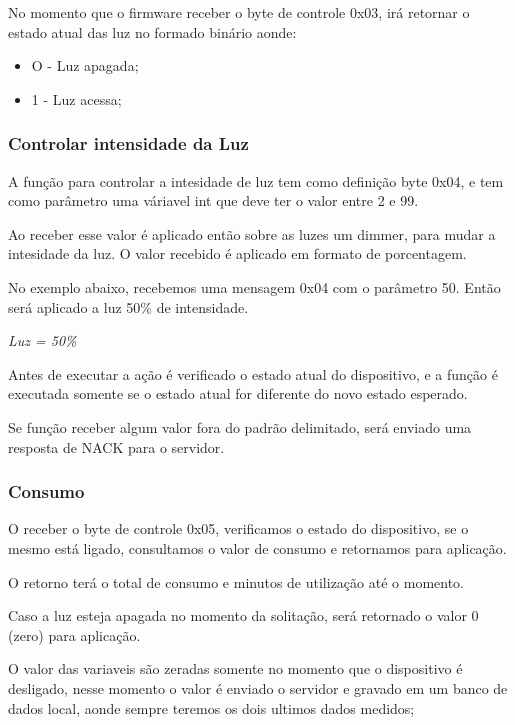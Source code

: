 \documentclass[openright]{normas-utf-tex} %
\begin{document}
No momento que o firmware receber o byte de controle 0x03, irá retornar o estado atual das luz no formado binário aonde:

\begin{itemize}
    \item O - Luz apagada;
    \item 1 - Luz acessa;
\end{itemize}

\subsubsection{Controlar intensidade da Luz}
A função para controlar a intesidade de luz tem como definição byte 0x04, e tem como parâmetro uma váriavel int que deve ter o valor entre 2 e 99.

Ao receber esse valor é aplicado então sobre as luzes um dimmer, para mudar a intesidade da luz. O valor recebido é aplicado em formato de porcentagem.

No exemplo abaixo, recebemos uma mensagem 0x04 com o parâmetro 50. Então será aplicado a luz 50\% de intensidade.

\begin{center}
    \textit{
    Luz =  50\%
    }
\end{center}

Antes de executar a ação é verificado o estado atual do dispositivo, e a função é executada somente se o estado atual for diferente do novo estado esperado.

Se função receber algum valor fora do padrão delimitado, será enviado uma resposta de NACK para o servidor.

\subsubsection{Consumo}
O receber o byte de controle 0x05, verificamos o estado do dispositivo, se o mesmo está ligado, consultamos o valor de consumo e retornamos para aplicação.

O retorno terá o total de consumo e minutos de utilização até o momento.

Caso a luz esteja apagada no momento da solitação, será retornado o valor 0 (zero) para aplicação.

O valor das variaveis são zeradas somente no momento que o dispositivo é desligado, nesse momento o valor é enviado o servidor e gravado em um banco de dados local, aonde sempre teremos os dois ultimos dados medidos;
\end{document}
